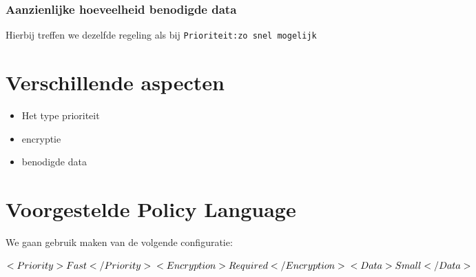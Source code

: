 \documentclass{article}
\begin{document}
\subsubsection{Aanzienlijke hoeveelheid benodigde data}
Hierbij treffen we dezelfde regeling als bij \texttt{Prioriteit:zo snel mogelijk}

\section{Verschillende aspecten}
\begin{itemize}
    \item Het type prioriteit
    \item encryptie
    \item benodigde data
\end{itemize}

\section{Voorgestelde Policy Language}
We gaan gebruik maken van de volgende configuratie: \\
\begin{center}
\begin{minipage}{.6\textwidth}
$<Priority>Fast</Priority>\\
<Encryption>Required</Encryption>\\
<Data>Small</Data>$\\
\end{minipage}
\end{center}
\end{document}

